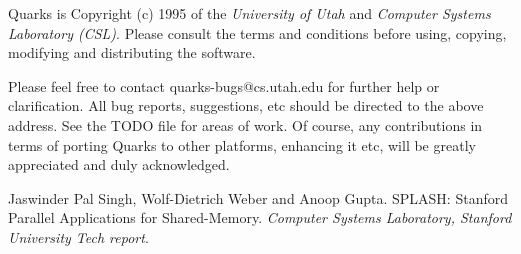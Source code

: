 
Quarks is Copyright (c) 1995 of the {\em University of Utah} and {\em
Computer Systems Laboratory (CSL)}. Please consult the terms and
conditions before using, copying, modifying and distributing the
software. 

Please feel free to contact quarks-bugs@cs.utah.edu for further
help or clarification.  All bug reports, suggestions, etc should be
directed to the above address.  See the TODO file for areas of work.
Of course, any contributions in terms of porting Quarks to other
platforms, enhancing it etc, will be greatly appreciated and duly
acknowledged. 



\begin{thebibliography}{99}

Jaswinder Pal Singh, Wolf-Dietrich Weber and Anoop Gupta. SPLASH:
Stanford Parallel Applications for Shared-Memory. {\em Computer
Systems Laboratory, Stanford University Tech report}.

\end{thebibliography}


